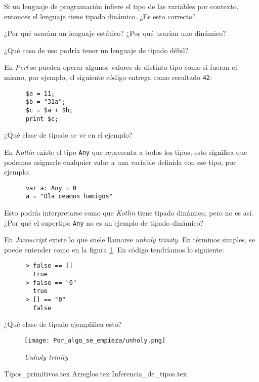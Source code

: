   \begin{exercise}
    Si un lenguaje de programación infiere el tipo de las variables por contexto, entonces el 
    lenguaje tiene tipado dinámico.
    ¿Es esto correcto?
  \end{exercise}

  \begin{exercise}
    ¿Por qué usarían un lenguaje estático?
    ¿Por qué usarían uno dinámico?
  \end{exercise}

  \begin{exercise}
    ¿Qué caso de uso podría tener un lenguaje de tipado débil?
  \end{exercise}

  \begin{exercise}
    En \textit{Perl} se pueden operar algunos valores de distinto tipo como si fueran el mismo,
    por ejemplo, el siguiente código entrega como resultado \texttt{42}:
    \begin{verbatim}
      $a = 11;
      $b = "31a";
      $c = $a + $b;
      print $c;
    \end{verbatim}

    ¿Qué clase de tipado se ve en el ejemplo?
  \end{exercise}
  
  \begin{exercise}
    En \textit{Kotlin} existe el tipo \texttt{Any} que representa a todos los tipos, 
    esto significa que podemos asignarle cualquier valor a una variable definida con ese tipo, por
    ejemplo:

    \begin{verbatim}
      var a: Any = 0
      a = "Ola ceamos hamigos"
    \end{verbatim}

    Esto podría interpretarse como que \textit{Kotlin} tiene tipado dinámico, pero no es así.
    ¿Por qué el supertipo \texttt{Any} no es un ejemplo de tipado dinámico?
  \end{exercise}

  \begin{exercise}
    En \textit{Javascript} existe lo que suele llamarse \textit{unholy trinity}.
    En términos simples, se puede entender como en la figura \ref{fig:unholy}.
    En código tendríamos lo siguiente:
    \begin{verbatim}
      > false == [] 
        true
      > false == "0"
        true
      > [] == "0"
        false
    \end{verbatim}

    ¿Qué clase de tipado ejemplifica esto?
  \end{exercise}

  \begin{figure}[ht!]
    \centering
    \texttt{[image: Por\_algo\_se\_empieza/unholy.png]}
    \caption{\textit{Unholy trinity}}
    \label{fig:unholy}
  \end{figure}

  {Tipos_primitivos.tex}
  {Arreglos.tex}
  {Inferencia_de_tipos.tex}